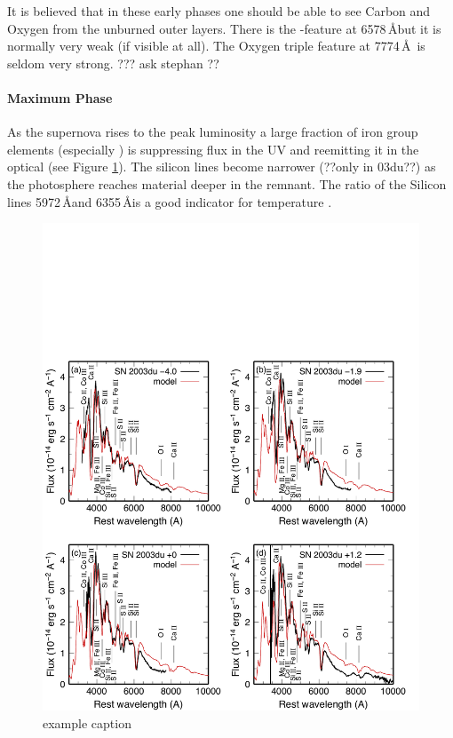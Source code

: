 It is believed that in these early phases one should be able to see Carbon and Oxygen from the unburned outer layers. There is the -feature at 6578\,\AA but it is normally very weak (if visible at all). The Oxygen triple feature at 7774\,\AA\ is seldom very strong. ??? ask stephan ??

\paragraph{Maximum Phase} As the supernova rises to the peak luminosity a large fraction of iron group elements (especially \Ni) is suppressing flux in the UV and reemitting it in the optical (see Figure \ref{fig:sn2003du_t0}). The silicon lines become narrower (??only in 03du??) as the photosphere reaches material deeper in the remnant. The ratio of the Silicon lines  5972\,\AA and  6355\,\AA is a good indicator for temperature \citep{1995ApJ...455L.147N}. 

\begin{figure}[htbp] %
   \centering
   \includegraphics[width=\textwidth]{chapter_intro/plots/sn2003du_t0.pdf} 
   \caption{example caption}
   \label{fig:sn2003du_t0}
\end{figure}

